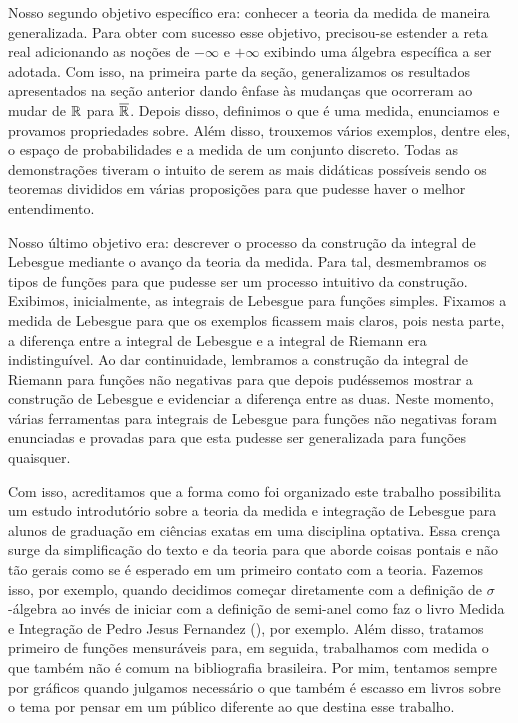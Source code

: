 	Nosso segundo objetivo específico era: conhecer a teoria da medida de maneira generalizada.
	Para obter com sucesso esse objetivo, precisou-se estender a reta real adicionando as noções de $-\infty$ e $+\infty$ exibindo uma álgebra específica a ser adotada.
	Com isso, na primeira parte da seção, generalizamos os resultados apresentados na seção anterior dando ênfase às mudanças que ocorreram ao mudar de $\mathbb{R}$ para $\overline{\mathbb{R}}$.
	Depois disso, definimos o que é uma medida, enunciamos e provamos propriedades sobre.
	Além disso, trouxemos vários exemplos, dentre eles, o espaço de probabilidades e a medida de um conjunto discreto.
	Todas as demonstrações tiveram o intuito de serem as mais didáticas possíveis sendo os teoremas divididos em várias proposições para que pudesse haver o melhor entendimento.
	
	Nosso último objetivo era: descrever o processo da construção da integral de Lebesgue mediante o avanço da teoria da medida.
	Para tal, desmembramos os tipos de funções para que pudesse ser um processo intuitivo da construção.
	Exibimos, inicialmente, as integrais de Lebesgue para funções simples.
	Fixamos a medida de Lebesgue para que os exemplos ficassem mais claros, pois nesta parte, a diferença entre a integral de Lebesgue e a integral de Riemann era indistinguível. 
	Ao dar continuidade, lembramos a construção da integral de Riemann para funções não negativas para que depois pudéssemos mostrar a construção de Lebesgue e evidenciar a diferença entre as duas.
	Neste momento, várias ferramentas para integrais de Lebesgue para funções não negativas foram enunciadas e provadas para que esta pudesse ser generalizada para funções quaisquer.  
   	
   	Com isso, acreditamos que a forma como foi organizado este trabalho possibilita um estudo introdutório sobre a teoria da medida e integração de Lebesgue para alunos de graduação em ciências exatas em uma disciplina optativa.
   	Essa crença surge da simplificação do texto e da teoria para que aborde coisas pontais e não tão gerais como se é esperado em um primeiro contato com a teoria. 
   	Fazemos isso, por exemplo, quando decidimos começar diretamente com a definição de $\sigma$-álgebra ao invés de iniciar com a definição de semi-anel como faz o livro Medida e Integração de Pedro Jesus Fernandez (\citeyear{pedro}), por exemplo.
   	Além disso, tratamos primeiro de funções mensuráveis para, em seguida, trabalhamos com medida o que também não é comum na bibliografia brasileira.
   	Por mim, tentamos sempre por gráficos quando julgamos necessário o que também é escasso em livros sobre o tema por pensar em um público diferente ao que destina esse trabalho. 
   	 
    
    
    
    
    
    
    
    
    
    
    
    
    
    
    
    
    
    